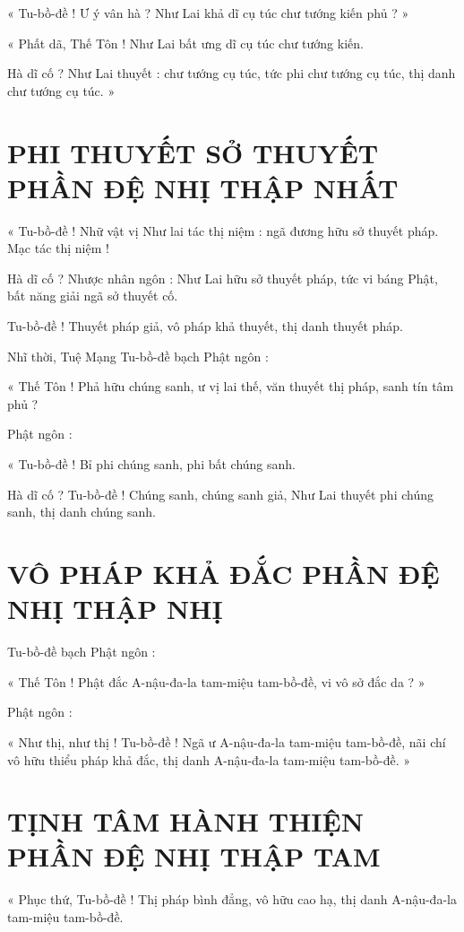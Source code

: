 	« Tu-bồ-đề ! Ư ý vân hà ? Như Lai khả dĩ cụ túc chư tướng kiến phủ ? »
	
	« Phất dã, Thế Tôn ! Như Lai bất ưng dĩ cụ túc chư tướng kiến. 
	
	Hà dĩ cố ? Như Lai thuyết : chư tướng cụ túc, tức phi chư tướng cụ túc, thị danh chư tướng cụ túc. »
	
	\section*{PHI THUYẾT SỞ THUYẾT PHẦN ĐỆ NHỊ THẬP NHẤT}
	
	« Tu-bồ-đề ! Nhữ vật vị Như lai tác thị niệm : ngã đương hữu sở thuyết pháp. Mạc tác thị niệm ! 
	
	Hà dĩ cố ? Nhược nhân ngôn : Như Lai hữu sở thuyết pháp, tức vi báng Phật, bất năng giải ngã sở thuyết cố. 
	
	Tu-bồ-đề ! Thuyết pháp giả, vô pháp khả thuyết, thị danh thuyết pháp.
	
	Nhĩ thời, Tuệ Mạng Tu-bồ-đề bạch Phật ngôn :
	
	« Thế Tôn ! Phả hữu chúng sanh, ư vị lai thế, văn thuyết thị pháp, sanh tín tâm phủ ?
	
	Phật ngôn :
	
	« Tu-bồ-đề ! Bỉ phi chúng sanh, phi bất chúng sanh. 
	
	Hà dĩ cố ? Tu-bồ-đề ! Chúng sanh, chúng sanh giả, Như Lai thuyết phi chúng sanh, thị danh chúng sanh.
	
	\section*{VÔ PHÁP KHẢ ĐẮC PHẦN ĐỆ NHỊ THẬP NHỊ}
	
	Tu-bồ-đề bạch Phật ngôn :
	
	« Thế Tôn ! Phật đắc A-nậu-đa-la tam-miệu tam-bồ-đề, vi vô sở đắc da ? »
	
	Phật ngôn :
	
	« Như thị, như thị ! Tu-bồ-đề ! Ngã ư A-nậu-đa-la tam-miệu tam-bồ-đề, nãi chí vô hữu thiểu pháp khả đắc, thị danh A-nậu-đa-la tam-miệu tam-bồ-đề. »
	
	\section*{TỊNH TÂM HÀNH THIỆN PHẦN ĐỆ NHỊ THẬP TAM}
	
	« Phục thứ, Tu-bồ-đề ! Thị pháp bình đẳng, vô hữu cao hạ, thị danh A-nậu-đa-la tam-miệu tam-bồ-đề. 
	
